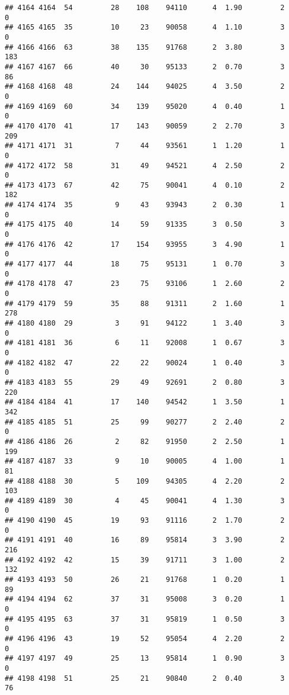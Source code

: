 \documentclass[
]{article}
\begin{document}
\begin{verbatim}
## 4164 4164  54         28    108    94110      4  1.90         2        0
## 4165 4165  35         10     23    90058      4  1.10         3        0
## 4166 4166  63         38    135    91768      2  3.80         3      183
## 4167 4167  66         40     30    95133      2  0.70         3       86
## 4168 4168  48         24    144    94025      4  3.50         2        0
## 4169 4169  60         34    139    95020      4  0.40         1        0
## 4170 4170  41         17    143    90059      2  2.70         3      209
## 4171 4171  31          7     44    93561      1  1.20         1        0
## 4172 4172  58         31     49    94521      4  2.50         2        0
## 4173 4173  67         42     75    90041      4  0.10         2      182
## 4174 4174  35          9     43    93943      2  0.30         1        0
## 4175 4175  40         14     59    91335      3  0.50         3        0
## 4176 4176  42         17    154    93955      3  4.90         1        0
## 4177 4177  44         18     75    95131      1  0.70         3        0
## 4178 4178  47         23     75    93106      1  2.60         2        0
## 4179 4179  59         35     88    91311      2  1.60         1      278
## 4180 4180  29          3     91    94122      1  3.40         3        0
## 4181 4181  36          6     11    92008      1  0.67         3        0
## 4182 4182  47         22     22    90024      1  0.40         3        0
## 4183 4183  55         29     49    92691      2  0.80         3      220
## 4184 4184  41         17    140    94542      1  3.50         1      342
## 4185 4185  51         25     99    90277      2  2.40         2        0
## 4186 4186  26          2     82    91950      2  2.50         1      199
## 4187 4187  33          9     10    90005      4  1.00         1       81
## 4188 4188  30          5    109    94305      4  2.20         2      103
## 4189 4189  30          4     45    90041      4  1.30         3        0
## 4190 4190  45         19     93    91116      2  1.70         2        0
## 4191 4191  40         16     89    95814      3  3.90         2      216
## 4192 4192  42         15     39    91711      3  1.00         2      132
## 4193 4193  50         26     21    91768      1  0.20         1       89
## 4194 4194  62         37     31    95008      3  0.20         1        0
## 4195 4195  63         37     31    95819      1  0.50         3        0
## 4196 4196  43         19     52    95054      4  2.20         2        0
## 4197 4197  49         25     13    95814      1  0.90         3        0
## 4198 4198  51         25     21    90840      2  0.40         3       76

\end{verbatim}
\end{document}
